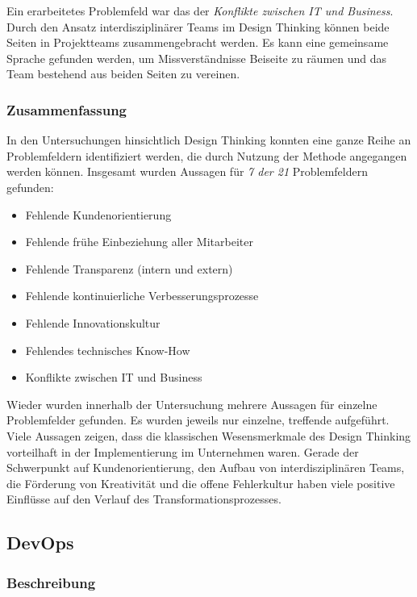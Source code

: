 Ein erarbeitetes Problemfeld war das der \textit{Konflikte zwischen IT und Business}. Durch den Ansatz interdisziplinärer Teams im Design Thinking können beide Seiten in Projektteams zusammengebracht werden. Es kann eine gemeinsame Sprache gefunden werden, um Missverständnisse Beiseite 
zu räumen und das Team bestehend aus beiden Seiten zu vereinen.

\todots

\subsubsection{Zusammenfassung}

In den Untersuchungen hinsichtlich Design Thinking konnten eine ganze Reihe an Problemfeldern identifiziert werden, die durch Nutzung der Methode angegangen werden können. Insgesamt wurden Aussagen für \textit{7 der 21} Problemfeldern gefunden:

\begin{itemize}[noitemsep, topsep=0pt]
	\item Fehlende Kundenorientierung
	\item Fehlende frühe Einbeziehung aller Mitarbeiter
	\item Fehlende Transparenz (intern und extern)
	\item Fehlende kontinuierliche Verbesserungsprozesse
	\item Fehlende Innovationskultur
	\item Fehlendes technisches Know-How
	\item Konflikte zwischen IT  und Business
\end{itemize}

Wieder wurden innerhalb der Untersuchung mehrere Aussagen für einzelne Problemfelder gefunden. Es wurden jeweils nur einzelne, treffende aufgeführt. Viele Aussagen zeigen, dass die klassischen Wesensmerkmale des Design Thinking vorteilhaft in der Implementierung im Unternehmen waren. Gerade der Schwerpunkt auf Kundenorientierung, den Aufbau von interdisziplinären Teams, die Förderung von Kreativität und die offene Fehlerkultur haben viele positive Einflüsse auf den Verlauf des Transformationsprozesses.
 
\subsection{DevOps}

\subsubsection{Beschreibung}

